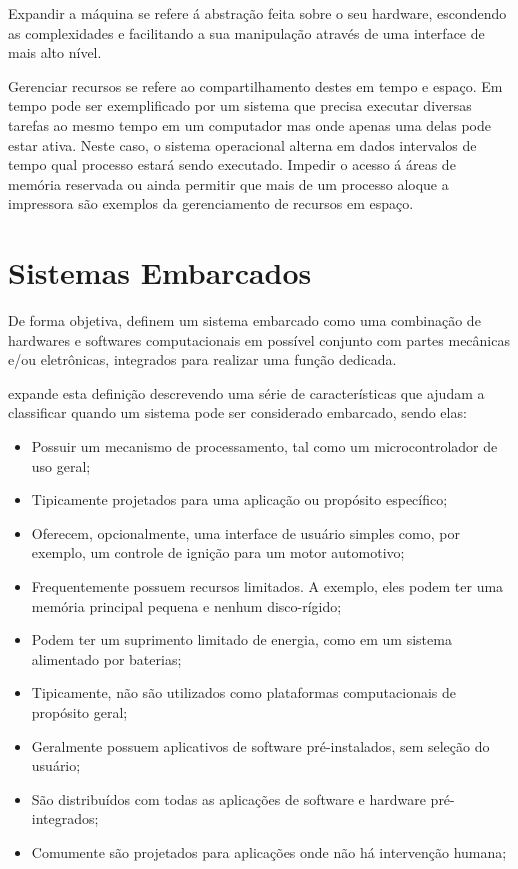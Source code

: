 Expandir a máquina se refere á abstração feita sobre o seu hardware, escondendo as complexidades e facilitando a sua manipulação através de uma interface de mais alto nível. 

Gerenciar recursos se refere ao compartilhamento destes em tempo e espaço. Em tempo pode ser exemplificado por um sistema que precisa executar diversas tarefas ao mesmo tempo em um computador mas onde apenas uma delas pode estar ativa. Neste caso, o sistema operacional alterna em dados intervalos de tempo qual processo estará sendo executado. Impedir o acesso á áreas de memória reservada ou ainda permitir que mais de um processo aloque a impressora são exemplos da gerenciamento de recursos em espaço.

\section{Sistemas Embarcados}

De forma objetiva,  definem um sistema embarcado como uma combinação de hardwares e softwares computacionais em possível conjunto com partes mecânicas e/ou eletrônicas, integrados para realizar uma função dedicada.

 expande esta definição descrevendo uma série de características que ajudam a classificar quando um sistema pode ser considerado embarcado, sendo elas:

\begin{itemize}
	\item Possuir um mecanismo de processamento, tal como um microcontrolador de uso geral;
	\item Tipicamente projetados para uma aplicação ou propósito específico;
	\item Oferecem, opcionalmente, uma interface de usuário simples como, por exemplo, um controle de ignição para um motor automotivo;
	\item Frequentemente possuem recursos limitados. A exemplo, eles podem ter uma memória principal pequena e nenhum disco-rígido;
	\item Podem ter um suprimento limitado de energia, como em um sistema alimentado por baterias;
	\item Tipicamente, não são utilizados como plataformas computacionais de propósito geral;
	\item Geralmente possuem aplicativos de software pré-instalados, sem seleção do usuário;
	\item São distribuídos com todas as aplicações de software e hardware pré-integrados;
	\item Comumente são projetados para aplicações onde não há intervenção humana;
\end{itemize}

